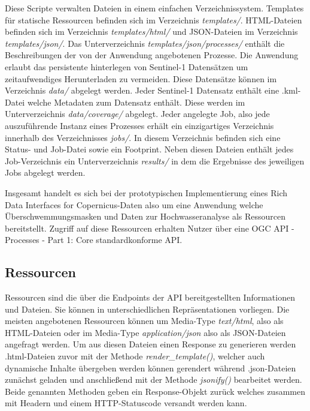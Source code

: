 Diese Scripte verwalten Dateien in einem einfachen Verzeichnissystem. Templates für statische Ressourcen befinden sich im Verzeichnis \textit{templates/}. HTML-Dateien 
befinden sich im Verzeichnis \textit{templates/html/} und JSON-Dateien im Verzeichnis \textit{templates/json/}. Das Unterverzeichnis \textit{templates/json/processes/} enthält die 
Beschreibungen der von der Anwendung angebotenen Prozesse. 
Die Anwendung erlaubt das persistente hinterlegen von Sentinel-1 Datensätzen um zeitaufwendiges Herunterladen zu vermeiden. Diese Datensätze können im Verzeichnis \textit{data/} abgelegt werden. Jeder Sentinel-1 Datensatz enthält eine .kml-Datei welche 
Metadaten zum Datensatz enthält. Diese werden im Unterverzeichnis \textit{data/coverage/} abgelegt. 
Jeder angelegte Job, also jede auszuführende Instanz eines Prozesses erhält ein einzigartiges Verzeichnis innerhalb des Verzeichnisses \textit{jobs/}. In diesem 
Verzeichnis befinden sich eine Status- und Job-Datei sowie ein Footprint. Neben diesen Dateien enthält jedes Job-Verzeichnis ein Unterverzeichnis \textit{results/} in dem
die Ergebnisse des jeweiligen Jobs abgelegt werden.

Insgesamt handelt es sich bei der prototypischen Implementierung eines Rich Data Interfaces for Copernicus-Daten also um eine Anwendung welche Überschwemmungsmasken und Daten zur Hochwasseranalyse als Ressourcen bereitstellt.
Zugriff auf diese Ressourcen erhalten Nutzer über eine OGC API - Processes - Part 1: Core standardkonforme API. 

\subsection{Ressourcen}
Ressourcen sind die über die Endpoints der API bereitgestellten Informationen und Dateien. Sie können in unterschiedlichen Repräsentationen vorliegen.
Die meisten angebotenen Ressourcen können um Media-Type \textit{text/html}, also als HTML-Dateien oder im Media-Type \textit{application/json} also als 
JSON-Dateien angefragt werden. Um aus diesen Dateien einen Response zu generieren werden .html-Dateien zuvor mit der Methode \textit{render\_template()}, welcher auch 
dynamische Inhalte übergeben werden können gerendert während .json-Dateien zunächst geladen und anschließend 
mit der Methode \textit{jsonify()} bearbeitet werden. Beide genannten Methoden
geben ein Response-Objekt zurück welches zusammen mit Headern und einem HTTP-Statuscode versandt werden kann. \\

